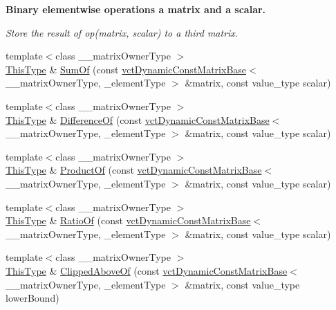\begin{Indent}{\bf Binary elementwise operations a matrix and a scalar.}\par
{\em Store the result of op(matrix, scalar) to a third matrix. }\begin{DoxyCompactItemize}
\item 
{\footnotesize template$<$class \-\_\-\-\_\-matrix\-Owner\-Type $>$ }\\\hyperlink{classvct_dynamic_const_matrix_base_ac4ff48cbe4d9de3fdef5a02447ffb9db}{This\-Type} \& \hyperlink{classvct_dynamic_matrix_base_a325e7079c6b0606ef803b1a0d6fd009f}{Sum\-Of} (const \hyperlink{classvct_dynamic_const_matrix_base}{vct\-Dynamic\-Const\-Matrix\-Base}$<$ \-\_\-\-\_\-matrix\-Owner\-Type, \-\_\-element\-Type $>$ \&matrix, const value\-\_\-type scalar)
\item 
{\footnotesize template$<$class \-\_\-\-\_\-matrix\-Owner\-Type $>$ }\\\hyperlink{classvct_dynamic_const_matrix_base_ac4ff48cbe4d9de3fdef5a02447ffb9db}{This\-Type} \& \hyperlink{classvct_dynamic_matrix_base_a57823b1ecc143bcbcf9c3b9982c7cf67}{Difference\-Of} (const \hyperlink{classvct_dynamic_const_matrix_base}{vct\-Dynamic\-Const\-Matrix\-Base}$<$ \-\_\-\-\_\-matrix\-Owner\-Type, \-\_\-element\-Type $>$ \&matrix, const value\-\_\-type scalar)
\item 
{\footnotesize template$<$class \-\_\-\-\_\-matrix\-Owner\-Type $>$ }\\\hyperlink{classvct_dynamic_const_matrix_base_ac4ff48cbe4d9de3fdef5a02447ffb9db}{This\-Type} \& \hyperlink{classvct_dynamic_matrix_base_a05f7d5634a169de67aec9bff5dd3a7ce}{Product\-Of} (const \hyperlink{classvct_dynamic_const_matrix_base}{vct\-Dynamic\-Const\-Matrix\-Base}$<$ \-\_\-\-\_\-matrix\-Owner\-Type, \-\_\-element\-Type $>$ \&matrix, const value\-\_\-type scalar)
\item 
{\footnotesize template$<$class \-\_\-\-\_\-matrix\-Owner\-Type $>$ }\\\hyperlink{classvct_dynamic_const_matrix_base_ac4ff48cbe4d9de3fdef5a02447ffb9db}{This\-Type} \& \hyperlink{classvct_dynamic_matrix_base_a6f7fb3c88d0e1f1a78a78474664e8477}{Ratio\-Of} (const \hyperlink{classvct_dynamic_const_matrix_base}{vct\-Dynamic\-Const\-Matrix\-Base}$<$ \-\_\-\-\_\-matrix\-Owner\-Type, \-\_\-element\-Type $>$ \&matrix, const value\-\_\-type scalar)
\item 
{\footnotesize template$<$class \-\_\-\-\_\-matrix\-Owner\-Type $>$ }\\\hyperlink{classvct_dynamic_const_matrix_base_ac4ff48cbe4d9de3fdef5a02447ffb9db}{This\-Type} \& \hyperlink{classvct_dynamic_matrix_base_aac478e047096c7e76955de0c4107c764}{Clipped\-Above\-Of} (const \hyperlink{classvct_dynamic_const_matrix_base}{vct\-Dynamic\-Const\-Matrix\-Base}$<$ \-\_\-\-\_\-matrix\-Owner\-Type, \-\_\-element\-Type $>$ \&matrix, const value\-\_\-type lower\-Bound)

\end{DoxyCompactItemize}
\end{Indent}
